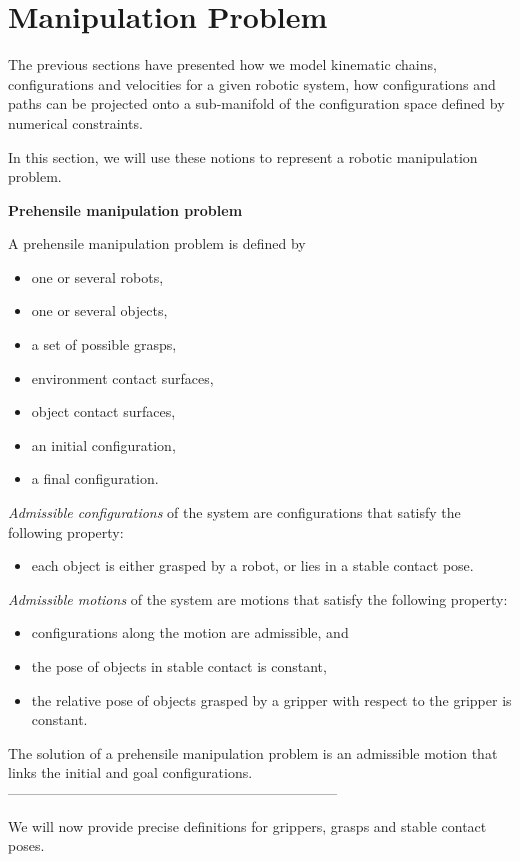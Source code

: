 \section{Manipulation Problem}\label{sec:manipulation-problem}

The previous sections have presented how we model kinematic chains, configurations and velocities for a given robotic system, how configurations and paths can be projected onto a sub-manifold of the configuration space defined by numerical constraints.

In this section, we will use these notions to represent a robotic manipulation problem.

\begin{definition}\label{def:manipulation-problem}\textbf{Prehensile manipulation problem}
  
  \noindent A prehensile manipulation problem is defined by
  \begin{itemize}
  \item one or several robots,
  \item one or several objects,
  \item a set of possible grasps,
  \item environment contact surfaces,
  \item object contact surfaces,
  \item an initial configuration,
  \item a final configuration.
  \end{itemize}
  \textit{Admissible configurations} of the system are configurations that satisfy the following property:
  \begin{itemize}
    \item each object is either grasped by a robot, or lies in a stable contact pose.
  \end{itemize}
  \textit{Admissible motions} of the system are motions that satisfy the following property:
  \begin{itemize}
  \item configurations along the motion are admissible, and
  \item the pose of objects in stable contact is constant,
  \item the relative pose of objects grasped by a gripper with respect to the gripper is constant.
  \end{itemize}
  The solution of a prehensile manipulation problem is an admissible motion that
  links the initial and goal configurations.\\
  -----------------------------------------------------------------------
\end{definition}
We will now provide precise definitions for grippers, grasps and stable contact poses.

